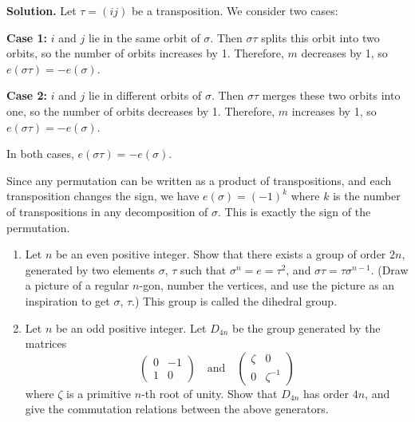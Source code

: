 \noindent\textbf{Solution.} Let $\tau = (ij)$ be a transposition. We consider two cases:

\textbf{Case 1:} $i$ and $j$ lie in the same orbit of $\sigma$. Then $\sigma\tau$ splits this orbit into two orbits, so the number of orbits increases by 1. Therefore, $m$ decreases by 1, so $e(\sigma\tau) = -e(\sigma)$.

\textbf{Case 2:} $i$ and $j$ lie in different orbits of $\sigma$. Then $\sigma\tau$ merges these two orbits into one, so the number of orbits decreases by 1. Therefore, $m$ increases by 1, so $e(\sigma\tau) = -e(\sigma)$.

In both cases, $e(\sigma\tau) = -e(\sigma)$.

Since any permutation can be written as a product of transpositions, and each transposition changes the sign, we have $e(\sigma) = (-1)^k$ where $k$ is the number of transpositions in any decomposition of $\sigma$. This is exactly the sign of the permutation.

\begin{problembox}
\begin{enumerate}[label=(\alph*)]
\item Let $n$ be an even positive integer. Show that there exists a group of order $2n$, generated by two elements $\sigma$, $\tau$ such that $\sigma^n = e = \tau^2$, and $\sigma\tau = \tau\sigma^{n-1}$. (Draw a picture of a regular $n$-gon, number the vertices, and use the picture as an inspiration to get $\sigma$, $\tau$.) This group is called the dihedral group.
\item Let $n$ be an odd positive integer. Let $D_{4n}$ be the group generated by the matrices
\[\begin{pmatrix}
0 & -1 \\
1 & 0 
\end{pmatrix} \quad \text{and} \quad \begin{pmatrix}
\zeta & 0 \\
0 & \zeta^{-1}
\end{pmatrix}\]
where $\zeta$ is a primitive $n$-th root of unity. Show that $D_{4n}$ has order $4n$, and give the commutation relations between the above generators.
\end{enumerate}
\end{problembox}

